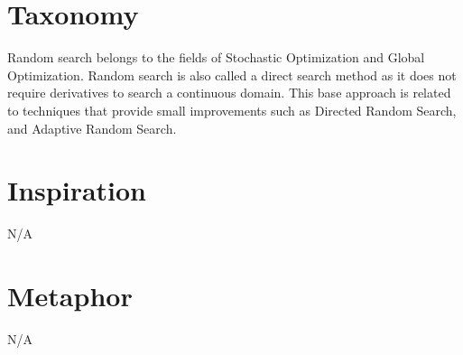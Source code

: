\documentclass[a4paper, 11pt]{article}
\begin{document}
\section{Taxonomy}
\label{sec:taxonomy}
Random search belongs to the fields of Stochastic Optimization and Global Optimization.
Random search is also called a direct search method as it does not require derivatives to search a continuous domain.
This base approach is related to techniques that provide small improvements such as Directed Random Search, and Adaptive Random Search. 

\section{Inspiration}
\label{sec:inspiration}
N/A

\section{Metaphor}
\label{sec:metaphor}
N/A
\end{document}
